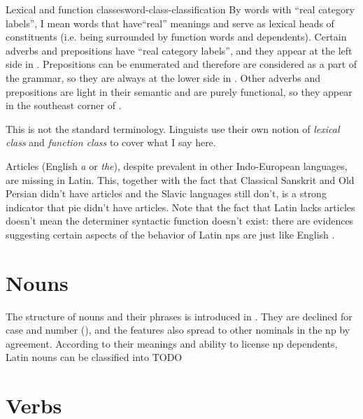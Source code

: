 \documentclass[a4paper, oneside]{report}
\newcommand*{\term}[1]{\emph{#1}}
\newcommand{\form}[1]{\emph{#1}}
\begin{document}
\begin{theorybox}{Lexical and function classes}{word-class-classification}
    By words with ``real category labels'',
    I mean words that have``real'' meanings
    and serve as lexical heads of constituents
    (i.e. being surrounded by function words and dependents).
    Certain adverbs and prepositions have ``real category labels'',
    and they appear at the left side in .
    Prepositions can be enumerated and therefore are considered as a part of the grammar,
    so they are always at the lower side in .
    Other adverbs and prepositions are light in their semantic
    and are purely functional,
    so they appear in the southeast corner of .

    This is not the standard terminology. 
    Linguists use their own notion of \term{lexical class} and \term{function class}
    to cover what I say here. 
\end{theorybox}

\begin{sidewaysfigure}
    \centering
    
    \caption{Latin word classes}
    \label{fig:latin-word-class}
\end{sidewaysfigure}

Articles (English \form{a} or \form{the}), 
despite prevalent in other Indo-European languages,
are missing in Latin.
This, together with the fact that Classical Sanskrit and Old Persian didn't have articles 
and the Slavic languages still don't,
is a strong indicator that \ac{pie} didn't have articles. 
Note that the fact that Latin lacks articles 
doesn't mean the determiner syntactic function doesn't exist:
there are evidences suggesting certain aspects of the behavior of Latin \acs{np}s 
are just like English \citep{giusti2014split}.

\section{Nouns}

The structure of nouns and their phrases is introduced in .
They are declined for case and number (),
and the features also spread to other nominals in the \acs{np} by agreement.
According to their meanings and ability to license \acs{np} dependents, 
Latin nouns can be classified into TODO 

\section{Verbs}\label{sec:pos.verb}
\end{document}
